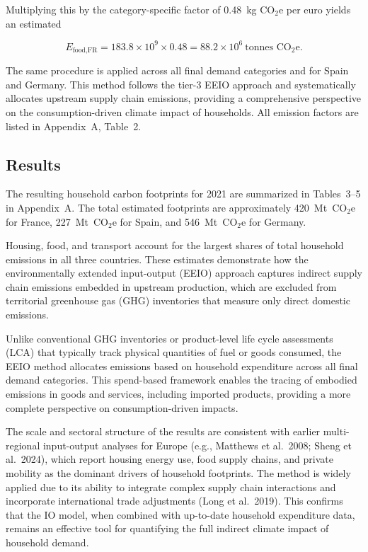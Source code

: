 \documentclass[12pt,a4paper]{article}%
\begin{document}
Multiplying this by the category-specific factor of 0.48~kg CO$_2$e per euro yields an estimated

\[
E_{\text{food,FR}} = 183.8 \times 10^9 \times 0.48 = 88.2 \times 10^6~\text{tonnes CO}_2\text{e}.
\]

The same procedure is applied across all final demand categories and for Spain and Germany. This method follows the tier-3 EEIO approach and systematically allocates upstream supply chain emissions, providing a comprehensive perspective on the consumption-driven climate impact of households. All emission factors are listed in Appendix~A, Table~2.

\subsection{Results}

The resulting household carbon footprints for 2021 are summarized in Tables~3--5 in Appendix~A. The total estimated footprints are approximately 420~Mt~CO$_2$e for France, 227~Mt~CO$_2$e for Spain, and 546~Mt~CO$_2$e for Germany.

Housing, food, and transport account for the largest shares of total household emissions in all three countries. These estimates demonstrate how the environmentally extended input-output (EEIO) approach captures indirect supply chain emissions embedded in upstream production, which are excluded from territorial greenhouse gas (GHG) inventories that measure only direct domestic emissions.

Unlike conventional GHG inventories or product-level life cycle assessments (LCA) that typically track physical quantities of fuel or goods consumed, the EEIO method allocates emissions based on household expenditure across all final demand categories. This spend-based framework enables the tracing of embodied emissions in goods and services, including imported products, providing a more complete perspective on consumption-driven impacts.

The scale and sectoral structure of the results are consistent with earlier multi-regional input-output analyses for Europe (e.g., Matthews et al.~2008; Sheng et al.~2024), which report housing energy use, food supply chains, and private mobility as the dominant drivers of household footprints. The method is widely applied due to its ability to integrate complex supply chain interactions and incorporate international trade adjustments (Long et al.~2019). This confirms that the IO model, when combined with up-to-date household expenditure data, remains an effective tool for quantifying the full indirect climate impact of household demand.
\end{document}
